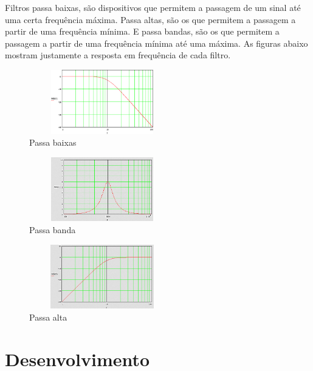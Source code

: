 \documentclass[conference]{IEEEtran}
\begin{document}
Filtros passa baixas, são dispositivos que permitem a passagem de um sinal até uma certa frequência máxima. Passa altas, são os que permitem a passagem a partir de uma frequência mínima. E passa bandas, são os que permitem a passagem a partir de uma frequência mínima até uma máxima. As figuras abaixo mostram justamente a resposta em frequência de cada filtro.


\begin{figure}[!h]
\centering
\includegraphics[width=2.5in, height=1.1in]{Imagens/baixass.eps}
\caption{Passa baixas} 
\label{baixa}
\end{figure}
\begin{figure}[!htb]
\centering
\includegraphics[width=2.5in, height=1.1in]{Imagens/BANDAA.png}
\caption{Passa banda}
\label{banda}
\end{figure}
\begin{figure}[!htb]
\centering
\includegraphics[width=2.5in, height=1.1in]{Imagens/ALTAA.png}
\caption{Passa alta} 
\label{alta}
\end{figure}


\section{Desenvolvimento}
\end{document}

